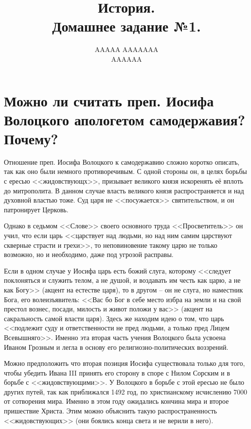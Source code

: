 \documentclass[12pt]{article}
\title{История. \\ Домашнее задание №1.}
\author{AAAAA AAAAAAA \\ AAAAAA}
\begin{document}
  \maketitle
  \setcounter{section}{2}

  \section{Можно ли считать преп. Иосифа Волоцкого апологетом\protect\footnotemark{} самодержавия\protect\footnotemark{}? Почему?}
  \addtocounter{footnote}{-2}

  Отношение преп. Иосифа Волоцкого к самодержавию сложно коротко описать, так как оно были немного противоречивым.
  С одной стороны он, в целях борьбы с ересью <<жидовствующх>>, призывает великого князя искоренять её вплоть до митрополита.
  В данном случае власть великого князя распространяется и над духовной властью тоже.
  Суд царя не <<посужается>> святительством, и он патронирует Церковь.

  Однако в седьмом <<Слове>> своего основного труда <<Просветитель>> он учил,
  что если царь <<царствует над людьми, но над ним самим царствуют скверные страсти и грехи>>,
  то неповиновение такому царю не только возможно, но и необходимо, даже под угрозой расправы.

  Если в одном случае у Иосифа царь есть божий слуга,
  которому <<следует поклоняться и служить телом, а не душой, и воздавать им честь как царю, а не как Богу>> (акцент на естестве царя),
  то в другом -- он не слуга, но наместник Бога, его волеизъявитель:
  <<Вас бо Бог в себе место избра на земли и на свой престол вознес, посади, милость и живот положи у вас>>
  (акцент на сакральность самой власти царя).
  Здесь же находим идею о том, что царь <<подлежит суду и ответственности не пред людьми, а только пред Лицем Всевышняго>>.
  Именно эта вторая часть учения Волоцкого была усвоена Иваном Грозным и легла в основу его религиозно-политических воззрений.

  Можно предположить что вторая позиция Иосифа существовала только для того,
  чтобы убедить Ивана III принять его сторону в споре с Нилом Сорским и в борьбе с <<жидовствующими>>.
  У Волоцкого в борьбе с этой ересью не было других путей, так как приближался 1492 год, по христианскому исчислению 7000 от сотворения мира.
  Именно в этом году ожидались кончина мира и второе пришествие Христа.
  Этим можно объяснить такую распространенность <<жидовствующих>> (они боялись конца света и не верили в него).
\end{document}
